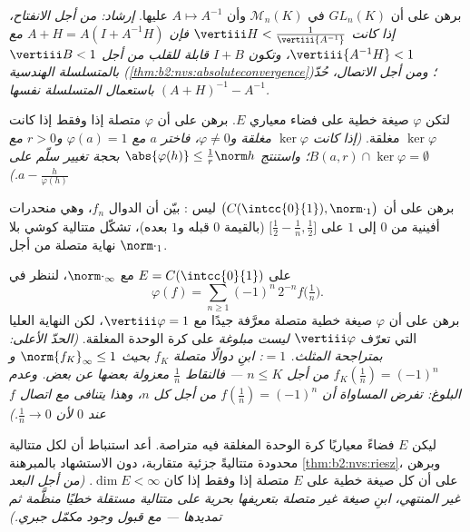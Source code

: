 \begin{exercise}[$\star\star$]\label{exo:b2:nvs:5}
برهن على أن $GL_n(K)$  في $\mathcal{M}_n(K)$ وأن $A
\mapsto A^{-1}$  عليها. \emph{إرشاد: من أجل الانفتاح، إذا كانت
$\vertiii H < \frac{1}{\vertiii{A^{-1}}}$ فإن $A + H = A(I +
A^{-1}H)$ مع $\vertiii{A^{-1}H} < 1$، وتكون $I + B$ قابلة للقلب
من أجل $\vertiii B < 1$ بالمتسلسلة الهندسية
(\cref{thm:b2:nvs:absoluteconvergence})؛ ومن أجل الاتصال، حُدّ
$(A+H)^{-1} - A^{-1}$ باستعمال المتسلسلة نفسها.}
\end{exercise}

\begin{exercise}[$\star\star$]\label{exo:b2:nvs:6}
لتكن $\varphi$ صيغة خطية على فضاء معياري $E$. برهن على أن
$\varphi$ متصلة إذا وفقط إذا كانت $\ker\varphi$ مغلقة.
\emph{(إذا كانت $\ker\varphi$ مغلقة و$\varphi \neq 0$، فاختر $a$
مع $\varphi(a) = 1$ و$r > 0$ مع $B(a, r) \cap \ker\varphi =
\emptyset$؛ واستنتج $\abs{\varphi(h)} \leq \frac{1}{r}\norm h$ بحجة
تغيير سلّم على $a - \frac{h}{\varphi(h)}$.)}
\end{exercise}

\begin{exercise}[$\star\star$]\label{exo:b2:nvs:7}
برهن على أن $\bigl(C(\intcc{0}{1}), \norm\cdot_1\bigr)$ ليس
: بيّن أن الدوال $f_n$، وهي منحدرات أفينية من $0$ إلى
$1$ على $\bigl[\frac12 - \frac1n, \frac12\bigr]$ (بالقيمة $0$
قبله و$1$ بعده)، تشكّل متتالية كوشي بلا نهاية متصلة
من أجل $\norm\cdot_1$.
\end{exercise}

\begin{exercise}[$\star\star\star$]\label{exo:b2:nvs:8}
على $E = C(\intcc{0}{1})$ مع $\norm\cdot_\infty$، لننظر في
\[
\varphi(f) = \sum_{n \geq 1} (-1)^n\, 2^{-n} f\bigl(\tfrac1n\bigr).
\]
برهن على أن $\varphi$ صيغة خطية متصلة معرَّفة جيدًا مع
$\vertiii\varphi = 1$، لكن النهاية العليا التي تعرّف
$\vertiii\varphi$ \emph{ليست مبلوغة} على كرة الوحدة المغلقة.
\emph{(الحدّ الأعلى: بمتراجحة المثلث.  $= 1$: ابنِ
دوالًا متصلة $f_K$ بحيث $\norm{f_K}_\infty \leq 1$ و$f_K(\frac1n)
= (-1)^n$ من أجل $n \leq K$ --- فالنقاط $\frac1n$ معزولة
بعضها عن بعض. وعدم البلوغ: تفرض المساواة أن $f(\frac1n) =
(-1)^n$ من أجل كل $n$، وهذا يتنافى مع اتصال $f$ عند $0$
لأن $\frac1n \to 0$.)}
\end{exercise}

\begin{exercise}[$\star\star\star$]\label{exo:b2:nvs:9}
ليكن $E$ فضاءً معياريًا كرة الوحدة المغلقة فيه متراصة.
أعد استنباط أن لكل متتالية محدودة متتاليةً جزئية متقاربة، دون
الاستشهاد بالمبرهنة \cref{thm:b2:nvs:riesz}، وبرهن على أن كل
صيغة خطية على $E$ متصلة إذا وفقط إذا كان $\dim E < \infty$.
\emph{(من أجل البعد غير المنتهي، ابنِ صيغة غير متصلة
بتعريفها بحرية على متتالية مستقلة خطيًا منظَّمة
ثم تمديدها --- مع قبول وجود مكمّل
جبري.)}
\end{exercise}

